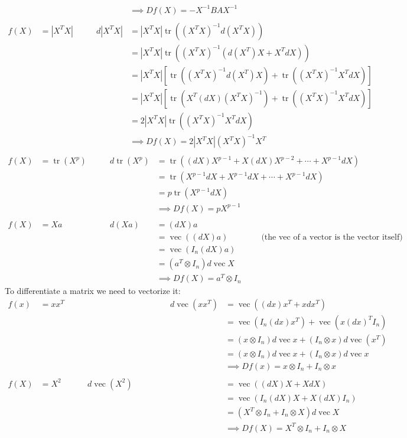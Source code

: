 \documentclass[a4paper,12pt]{article}
\begin{document}
$$\begin{alignat}{2}
  & & &\implies Df(X) = -X^{-1}BAX^{-1} \\
\\
f(X) &= |X^TX| & \qquad d|X^TX| &= |X^TX|\operatorname{tr}((X^TX)^{-1}d(X^TX)) \\
  & & &= |X^TX|\operatorname{tr}((X^TX)^{-1}(d(X^T)X + X^TdX)) \\
  & & &= |X^TX|\left[\operatorname{tr}((X^TX)^{-1}d(X^T)X) + \operatorname{tr}((X^TX)^{-1}X^TdX)\right] \\
  & & &= |X^TX|\left[\operatorname{tr}(X^T(dX)(X^TX)^{-1}) + \operatorname{tr}((X^TX)^{-1}X^TdX)\right] \\
  & & &= 2|X^TX|\operatorname{tr}((X^TX)^{-1}X^TdX) \\
  & & &\implies Df(X) = 2|X^TX|(X^TX)^{-1}X^T \\
\end{alignat} $$
$$\begin{alignat}{2}
f(X) &= \operatorname{tr}(X^p) & \qquad d\operatorname{tr}(X^p) &= \operatorname{tr}((dX)X^{p-1} + X(dX)X^{p-2} + \cdots + X^{p-1}dX) \\
  & & &= \operatorname{tr}(X^{p-1}dX + X^{p-1}dX + \cdots + X^{p-1}dX) \\
  & & &= p\operatorname{tr}(X^{p-1}dX) \\
  & & &\implies Df(X) = pX^{p-1} \\
\\
f(X) &= Xa & \qquad d(Xa) &= (dX)a\\
  & & &= \operatorname{vec}((dX)a) \qquad\qquad\text{(the vec of a vector is the vector itself)} \\
  & & &= \operatorname{vec}(I_n(dX)a) \\
  & & &= (a^T\otimes I_n)d\operatorname{vec}X \\
  & & &\implies Df(X) = a^T\otimes I_n
\end{alignat}
$$ To differentiate a matrix we need to vectorize it:
$$
\begin{alignat}{2}
f(x) &= xx^T & \qquad\qquad\qquad\qquad\qquad\qquad d\operatorname{vec}(xx^T) &= \operatorname{vec}((dx)x^T+xdx^T) \\
  & & &= \operatorname{vec}(I_n(dx)x^T) + \operatorname{vec}(x(dx)^TI_n) \\
  & & &= (x\otimes I_n)d\operatorname{vec}x + (I_n\otimes x)d\operatorname{vec}(x^T) \\
  & & &= (x\otimes I_n)d\operatorname{vec}x + (I_n\otimes x)d\operatorname{vec}x \\
  & & &\implies Df(x) = x\otimes I_n + I_n\otimes x \\
\\
f(X) &= X^2 & \qquad d\operatorname{vec}(X^2) &= \operatorname{vec}((dX)X + XdX) \\
  & & &= \operatorname{vec}(I_n(dX)X + X(dX)I_n) \\
  & & &= (X^T\otimes I_n + I_n\otimes X)d\operatorname{vec}X \\
  & & &\implies Df(X) = X^T\otimes I_n + I_n\otimes X
\end{alignat}
$$
\end{document}

